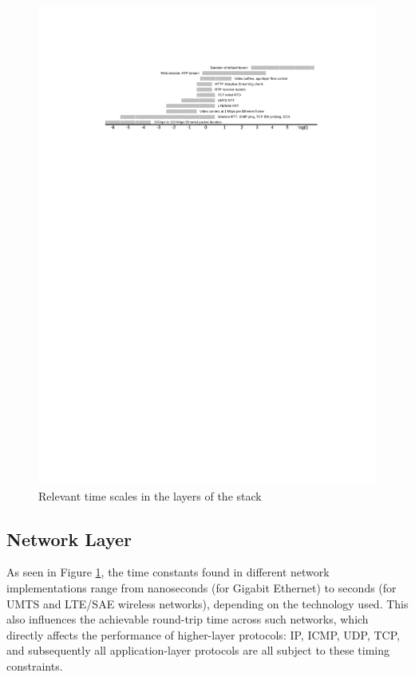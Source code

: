 \begin{figure}
\includegraphics[width=\textwidth]{images/streaming/timescales.pdf}
\caption{Relevant time scales in the layers of the stack}
\label{fig:timescales}
\end{figure}



\subsection{Network Layer}

As seen in Figure \ref{fig:timescales}, the time constants found in different network implementations range from nanoseconds (for Gigabit Ethernet) to seconds (for UMTS and LTE/SAE wireless networks), depending on the technology used. This also influences the achievable round-trip time across such networks, which directly affects the performance of higher-layer protocols: IP, ICMP, UDP, TCP, and subsequently all application-layer protocols are all subject to these timing constraints.

